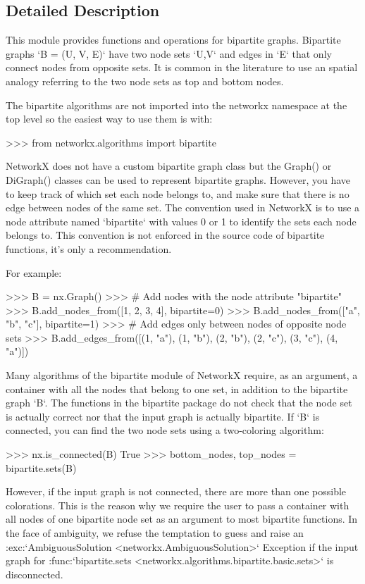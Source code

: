 \subsection{Detailed Description}
\begin{DoxyVerb}This module provides functions and operations for bipartite
graphs.  Bipartite graphs `B = (U, V, E)` have two node sets `U,V` and edges in
`E` that only connect nodes from opposite sets. It is common in the literature
to use an spatial analogy referring to the two node sets as top and bottom nodes.

The bipartite algorithms are not imported into the networkx namespace
at the top level so the easiest way to use them is with:

>>> from networkx.algorithms import bipartite

NetworkX does not have a custom bipartite graph class but the Graph()
or DiGraph() classes can be used to represent bipartite graphs. However,
you have to keep track of which set each node belongs to, and make
sure that there is no edge between nodes of the same set. The convention used
in NetworkX is to use a node attribute named `bipartite` with values 0 or 1 to
identify the sets each node belongs to. This convention is not enforced in
the source code of bipartite functions, it's only a recommendation.

For example:

>>> B = nx.Graph()
>>> # Add nodes with the node attribute "bipartite"
>>> B.add_nodes_from([1, 2, 3, 4], bipartite=0)
>>> B.add_nodes_from(["a", "b", "c"], bipartite=1)
>>> # Add edges only between nodes of opposite node sets
>>> B.add_edges_from([(1, "a"), (1, "b"), (2, "b"), (2, "c"), (3, "c"), (4, "a")])

Many algorithms of the bipartite module of NetworkX require, as an argument, a
container with all the nodes that belong to one set, in addition to the bipartite
graph `B`. The functions in the bipartite package do not check that the node set
is actually correct nor that the input graph is actually bipartite.
If `B` is connected, you can find the two node sets using a two-coloring
algorithm:

>>> nx.is_connected(B)
True
>>> bottom_nodes, top_nodes = bipartite.sets(B)

However, if the input graph is not connected, there are more than one possible
colorations. This is the reason why we require the user to pass a container
with all nodes of one bipartite node set as an argument to most bipartite
functions. In the face of ambiguity, we refuse the temptation to guess and
raise an :exc:`AmbiguousSolution <networkx.AmbiguousSolution>`
Exception if the input graph for
:func:`bipartite.sets <networkx.algorithms.bipartite.basic.sets>`
is disconnected.


\end{DoxyVerb}
